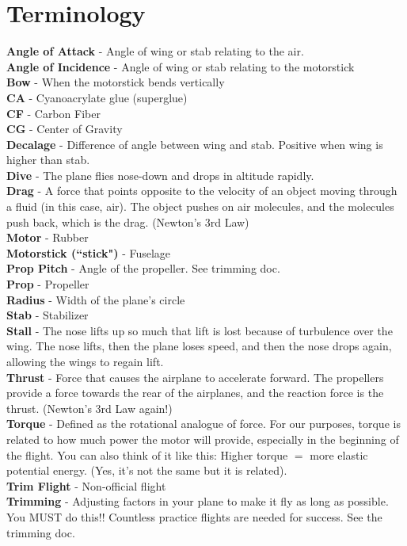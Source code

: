\documentclass[twocolumn]{article}
\begin{document}
\section{Terminology}
\textbf{Angle of Attack} - Angle of wing or stab relating to the air. \\
\textbf{Angle of Incidence} - Angle of wing or stab relating to the motorstick\\
\textbf{Bow} - When the motorstick bends vertically\\
\textbf{CA} - Cyanoacrylate glue (superglue)\\
\textbf{CF} - Carbon Fiber\\
\textbf{CG} - Center of Gravity\\
\textbf{Decalage} - Difference of angle between wing and stab. Positive when wing is higher than stab. \\
\textbf{Dive} - The plane flies nose-down and drops in altitude rapidly. \\
\textbf{Drag} - A force that points opposite to the velocity of an object moving through a fluid (in this case, air). The object pushes on air molecules, and the molecules push back, which is the drag. (Newton's 3rd Law)\\
\textbf{Motor} - Rubber\\
\textbf{Motorstick (``stick")} - Fuselage\\
\textbf{Prop Pitch} - Angle of the propeller. See trimming doc. \\
\textbf{Prop} - Propeller\\
\textbf{Radius} - Width of the plane's circle\\
\textbf{Stab} - Stabilizer\\
\textbf{Stall} - The nose lifts up so much that lift is lost because of turbulence over the wing. The nose lifts, then the plane loses speed, and then the nose drops again, allowing the wings to regain lift. \\
\textbf{Thrust} - Force that causes the airplane to accelerate forward. The propellers provide a force towards the rear of the airplanes, and the reaction force is the thrust. (Newton's 3rd Law again!)\\
\textbf{Torque} - Defined as the rotational analogue of force. For our purposes, torque is related to how much power the motor will provide, especially in the beginning of the flight. You can also think of it like this: Higher torque $=$ more elastic potential energy. (Yes, it's not the same but it is related). \\
\textbf{Trim Flight} - Non-official flight\\
\textbf{Trimming} - Adjusting factors in your plane to make it fly as long as possible. You MUST do this!! Countless practice flights are needed for success. See the trimming doc. \\
\end{document}
